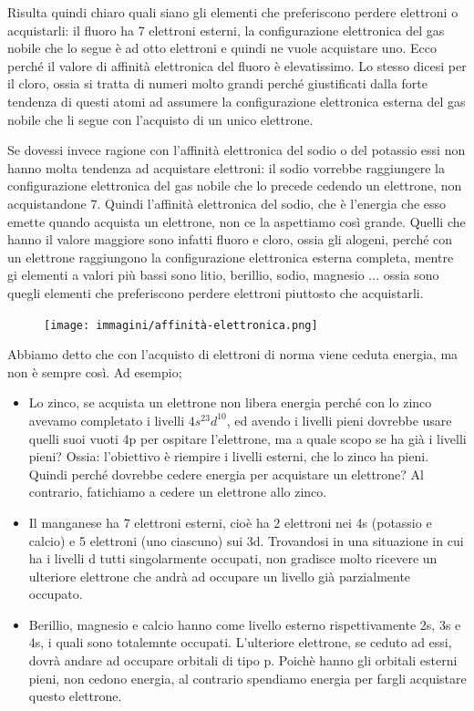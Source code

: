 Risulta quindi chiaro quali siano gli elementi che preferiscono perdere elettroni o acquistarli: il fluoro ha 7 elettroni esterni, la configurazione elettronica del gas nobile che lo segue è ad otto elettroni e quindi ne vuole acquistare uno. Ecco perché il valore di affinità elettronica del fluoro è elevatissimo. Lo stesso dicesi per il cloro, ossia si tratta di numeri molto grandi perché giustificati dalla forte tendenza di questi atomi ad assumere la configurazione elettronica esterna del gas nobile che li segue con l'acquisto di un unico elettrone.

Se dovessi invece ragione con l'affinità elettronica del sodio o del potassio essi non hanno molta tendenza ad acquistare elettroni: il sodio vorrebbe raggiungere la configurazione elettronica del gas nobile che lo precede cedendo un elettrone, non acquistandone 7. Quindi l'affinità elettronica del sodio, che è l'energia che esso emette quando acquista un elettrone, non ce la aspettiamo così grande. Quelli che hanno il valore maggiore sono infatti fluoro e cloro, ossia gli alogeni, perché con un elettrone raggiungono la configurazione elettronica esterna completa, mentre gi elementi a valori più bassi sono litio, berillio, sodio, magnesio ... ossia sono quegli elementi che preferiscono perdere elettroni piuttosto che acquistarli.

\begin{figure}[htp]
    \centering
    \texttt{[image: immagini/affinità-elettronica.png]}
\end{figure}

Abbiamo detto che con l'acquisto di elettroni di norma viene ceduta energia, ma non è sempre così. Ad esempio; 
\begin{itemize}
    \item Lo zinco, se acquista un elettrone non libera energia perché con lo zinco avevamo completato i livelli $4s^23d^{10}$, ed avendo i livelli pieni dovrebbe usare quelli suoi vuoti 4p per ospitare l'elettrone, ma a quale scopo se ha già i livelli pieni? Ossia: l'obiettivo è riempire i livelli esterni, che lo zinco ha pieni. Quindi perché dovrebbe cedere energia per acquistare un elettrone? Al contrario, fatichiamo a cedere un elettrone allo zinco. 
    \item Il manganese ha 7 elettroni esterni, cioè ha 2 elettroni nei 4s (potassio e calcio) e 5 elettroni (uno ciascuno) sui 3d. Trovandosi in una situazione in cui ha i livelli d tutti singolarmente occupati, non gradisce molto ricevere un ulteriore elettrone che andrà ad occupare un livello già parzialmente occupato.
    \item Berillio, magnesio e calcio hanno come livello esterno rispettivamente 2s, 3s e 4s, i quali sono totalemnte occupati. L'ulteriore elettrone, se ceduto ad essi, dovrà andare ad occupare orbitali di tipo p. Poichè hanno gli orbitali esterni pieni, non cedono energia, al contrario spendiamo energia per fargli acquistare questo elettrone.
\end{itemize}


